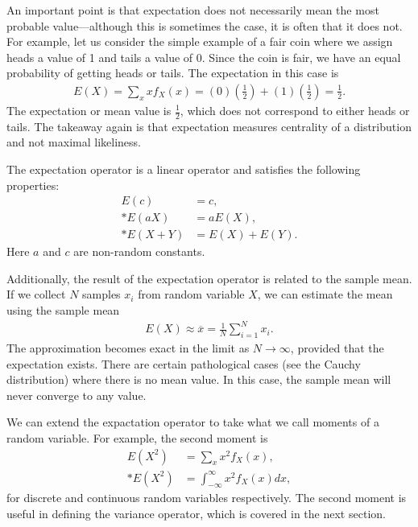 An important point is that expectation does not necessarily mean the most probable value---although this is sometimes the case, it is often that it does not. For example, let us consider the simple example of a fair coin where we assign heads a value of 1 and tails a value of 0. Since the coin is fair, we have an equal probability of getting heads or tails. The expectation in this case is
\begin{align}
  E(X) = \sum_x x f_X(x) = (0) ( \tfrac{1}{2} ) + (1) ( \tfrac{1}{2} ) = \tfrac{1}{2} . \nonumber
\end{align}
The expectation or mean value is $\tfrac{1}{2}$, which does not correspond to either heads or tails. The takeaway again is that expectation measures centrality of a distribution and not maximal likeliness.

The expectation operator is a linear operator and satisfies the following properties:
\begin{align}
  E(c) &= c, \\*
  E(aX) &= aE(X), \\*
  E(X + Y) &= E(X) + E(Y) .
\end{align}
Here $a$ and $c$ are non-random constants.

Additionally, the result of the expectation operator is related to the sample mean. If we collect $N$ samples $x_i$ from random variable $X$, we can estimate the mean using the sample mean
\begin{align}
  E(X) \approx \overline{x} = \frac{1}{N} \sum_{i=1}^N x_i .
\end{align}
The approximation becomes exact in the limit as $N \rightarrow \infty$, provided that the expectation exists. There are certain pathological cases (see the Cauchy distribution) where there is no mean value. In this case, the sample mean will never converge to any value.

We can extend the expactation operator to take what we call moments of a random variable. For example, the second moment is
\begin{subequations}
\begin{align}
  E(X^2) &= \sum_x x^2 f_X(x), \\*
  E(X^2) &= \int_{-\infty}^\infty x^2 f_X(x) dx ,
\end{align}
\end{subequations}
for discrete and continuous random variables respectively. The second moment is useful in defining the variance operator, which is covered in the next section.

